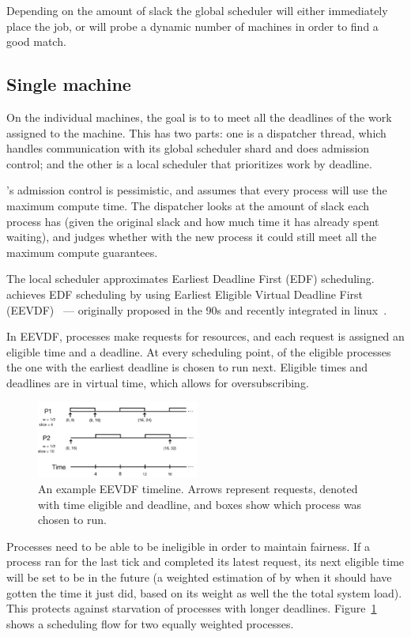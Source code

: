 Depending on the amount of slack the global scheduler will either immediately
place the job, or will probe a dynamic number of machines in order to find a
good match.


\subsection*{Single machine}

On the individual machines, the goal is to to meet all the deadlines of the work
assigned to the machine. This has two parts: one is a dispatcher thread, which
handles communication with its global scheduler shard and does admission
control; and the other is a local scheduler that prioritizes work by deadline.

\sysname{}'s admission control is pessimistic, and assumes that every process
will use the maximum compute time. The dispatcher looks at the amount of slack
each process has (given the original slack and how much time it has already
spent waiting), and judges whether with the new process it could still meet all
the maximum compute guarantees.


The local scheduler approximates Earliest Deadline First (EDF) scheduling.
\sysname{} achieves EDF scheduling by using Earliest Eligible Virtual Deadline
First (EEVDF)~\cite{eevdf} --- originally proposed in the 90s and recently
integrated in linux~\cite{linuxeevdf}.

In EEVDF, processes make requests for resources, and each request is assigned an
eligible time and a deadline. At every scheduling point, of the eligible
processes the one with the earliest deadline is chosen to run next. Eligible
times and deadlines are in virtual time, which allows for oversubscribing. 

\begin{figure}[t!]
    \centering
    \includegraphics[height=1in]{img/eevdf.png}
    \caption{An example EEVDF timeline. Arrows represent requests, denoted with
        time eligible and deadline, and boxes show which process was chosen to
        run.}
    \label{fig:eevdf}
\end{figure}

Processes need to be able to be ineligible in order to maintain fairness. If a
process ran for the last tick and completed its latest request, its next
eligible time will be set to be in the future (a weighted estimation of by when
it should have gotten the time it just did, based on its weight as well the the
total system load). This protects against starvation of processes with longer
deadlines. Figure~\ref{fig:eevdf} shows a scheduling flow for two equally weighted
processes.

